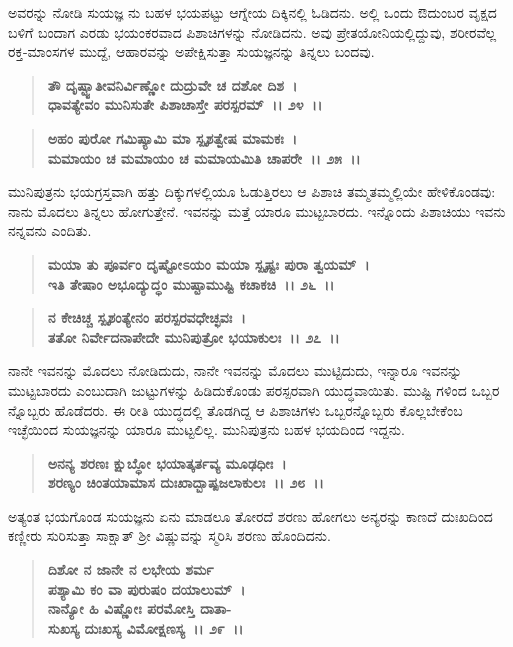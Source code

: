 ಅವರನ್ನು ನೋಡಿ ಸುಯಜ್ಞ ನು ಬಹಳ ಭಯಪಟ್ಟು ಆಗ್ನೇಯ ದಿಕ್ಕಿನಲ್ಲಿ ಓಡಿದನು. ಅಲ್ಲಿ ಒಂದು ಔದುಂಬರ ವೃಕ್ಷದ ಬಳಿಗೆ ಬಂದಾಗ ಎರಡು ಭಯಂಕರವಾದ ಪಿಶಾಚಿಗಳನ್ನು ನೋಡಿದನು. ಅವು ಪ್ರೇತಯೋನಿಯಲ್ಲಿದ್ದುವು, ಶರೀರವೆಲ್ಲ ರಕ್ತ-ಮಾಂಸಗಳ ಮುದ್ದೆ, ಆಹಾರವನ್ನು ಅಪೇಕ್ಷಿಸುತ್ತಾ ಸುಯಜ್ಞನನ್ನು ತಿನ್ನಲು ಬಂದವು.

\begin{verse}
\textbf{ತೌ ದೃಷ್ಟ್ವಾತೀವನಿರ್ವಿಣ್ಣೋ ದುದ್ರುವೇ ಚ ದಶೋ ದಿಶ~।}\\\textbf{ಧಾವತ್ಯೇವಂ ಮುನಿಸುತೇ ಪಿಶಾಚಾಸ್ತೇ ಪರಸ್ಪರಮ್~।। ೨೪~।। }
\end{verse}

\begin{verse}
\textbf{ಅಹಂ ಪುರೋ ಗಮಿಷ್ಯಾಮಿ ಮಾ ಸ್ಪೃಶತ್ವೇಷ ಮಾಮಕಃ~।}\\\textbf{ಮಮಾಯಂ ಚ ಮಮಾಯಂ ಚ ಮಮಾಯಮಿತಿ ಚಾಪರೇ~।। ೨೫~।।}
\end{verse}

ಮುನಿಪುತ್ರನು ಭಯಗ್ರಸ್ತವಾಗಿ ಹತ್ತು ದಿಕ್ಕುಗಳಲ್ಲಿಯೂ ಓಡುತ್ತಿರಲು ಆ ಪಿಶಾಚಿ ತಮ್ಮತಮ್ಮಲ್ಲಿಯೇ ಹೇಳಿಕೊಂಡವು: ನಾನು ಮೊದಲು ತಿನ್ನಲು ಹೋಗುತ್ತೇನೆ. ಇವನನ್ನು ಮತ್ತೆ ಯಾರೂ ಮುಟ್ಟಬಾರದು. ಇನ್ನೊಂದು ಪಿಶಾಚಿಯು ಇವನು ನನ್ನವನು ಎಂದಿತು.

\begin{verse}
\textbf{ಮಯಾ ತು ಪೂರ್ವಂ ದೃಷ್ಟೋಽಯಂ ಮಯಾ ಸ್ಪೃಷ್ಟಃ ಪುರಾ ತ್ವಯಮ್~।}\\\textbf{ಇತಿ ತೇಷಾಂ ಅಭೂದ್ಯುದ್ಧಂ ಮುಷ್ಟಾಮುಷ್ಟಿ ಕಚಾಕಚಿ~।। ೨೬~।।}
\end{verse}

\begin{verse}
\textbf{ನ ಕೇಚಿಚ್ಚ ಸ್ಪೃಶಂತ್ಯೇನಂ ಪರಸ್ಪರವಧೇಚ್ಛವಃ~।}\\\textbf{ತತೋ ನಿರ್ವೇದನಾಪೇದೇ ಮುನಿಪುತ್ರೋ ಭಯಾಕುಲಃ~।। ೨೭~।।}
\end{verse}

ನಾನೇ ಇವನನ್ನು ಮೊದಲು ನೋಡಿದುದು, ನಾನೇ ಇವನನ್ನು ಮೊದಲು ಮುಟ್ಟಿದುದು, ಇನ್ನಾರೂ ಇವನನ್ನು ಮುಟ್ಟಬಾರದು ಎಂಬುದಾಗಿ ಜುಟ್ಟುಗಳನ್ನು ಹಿಡಿದುಕೊಂಡು ಪರಸ್ಪರವಾಗಿ ಯುದ್ಧವಾಯಿತು. ಮುಷ್ಟಿ ಗಳಿಂದ ಒಬ್ಬರ ನ್ನೊಬ್ಬರು ಹೊಡೆದರು. ಈ ರೀತಿ ಯುದ್ಧದಲ್ಲಿ ತೊಡಗಿದ್ದ ಆ ಪಿಶಾಚಿಗಳು ಒಬ್ಬರನ್ನೊಬ್ಬರು ಕೊಲ್ಲಬೇಕೆಂಬ ಇಚ್ಛೆಯಿಂದ ಸುಯಜ್ಞನನ್ನು ಯಾರೂ ಮುಟ್ಟಲಿಲ್ಲ. ಮುನಿಪುತ್ರನು ಬಹಳ ಭಯದಿಂದ ಇದ್ದನು.

\begin{verse}
\textbf{ಅನನ್ಯ ಶರಣಃ ಕ್ಷುಬ್ಧೋ ಭಯಾತ್ಕರ್ತವ್ಯ ಮೂಢಧೀಃ~।}\\\textbf{ಶರಣ್ಯಂ ಚಿಂತಯಾಮಾಸ ದುಃಖಾದ್ಬಾಷ್ಪಜಲಾಕುಲಃ~।। ೨೮~।।}
\end{verse}

ಅತ್ಯಂತ ಭಯಗೊಂಡ ಸುಯಜ್ಞನು ಏನು ಮಾಡಲೂ ತೋರದೆ ಶರಣು ಹೋಗಲು ಅನ್ಯರನ್ನು ಕಾಣದೆ ದುಃಖದಿಂದ ಕಣ್ಣೀರು ಸುರಿಸುತ್ತಾ ಸಾಕ್ಷಾತ್ ಶ‍್ರೀ ವಿಷ್ಣುವನ್ನು ಸ್ಮರಿಸಿ ಶರಣು ಹೊಂದಿದನು.

\begin{verse}
\textbf{ದಿಶೋ ನ ಜಾನೇ ನ ಲಭೇಯ ಶರ್ಮ} \\\textbf{ಪಶ್ಯಾಮಿ ಕಂ ವಾ ಪುರುಷಂ ದಯಾಲುಮ್~।}\\\textbf{ನಾನ್ಯೋ ಹಿ ವಿಷ್ಣೋಃ ಪರಮೋಸ್ತಿ ದಾತಾ-} \\\textbf{ಸುಖಸ್ಯ ದುಃಖಸ್ಯ ವಿಮೋಕ್ಷಣಸ್ಯ~।। ೨೯~।। }
\end{verse}

